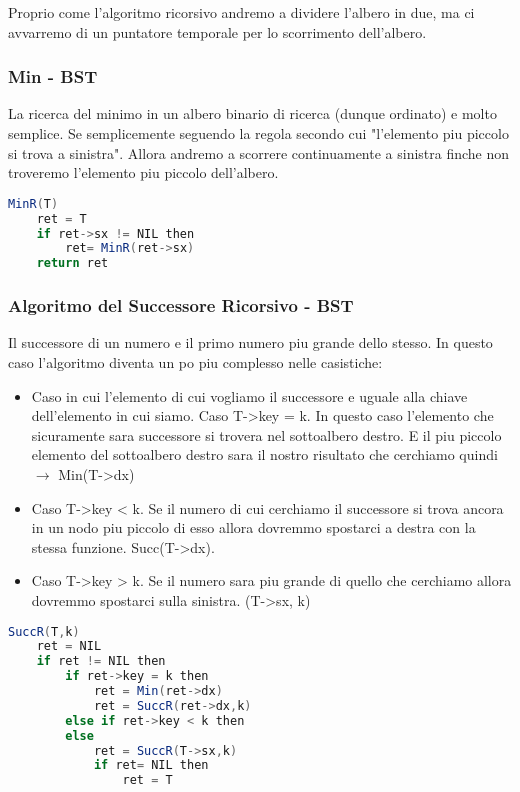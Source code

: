 Proprio come l'algoritmo ricorsivo andremo a dividere l'albero in due, ma ci avvarremo di un puntatore temporale per lo scorrimento dell'albero.

\subsubsection{Min - BST}
La ricerca del minimo in un albero binario di ricerca (dunque ordinato) e molto semplice. Se semplicemente seguendo la regola secondo cui "l'elemento piu piccolo si trova a sinistra". Allora andremo a scorrere continuamente a sinistra finche non troveremo l'elemento piu piccolo dell'albero.

\begin{lstlisting}[language=Java]
	MinR(T)
	ret = T
	if ret->sx != NIL then
		ret= MinR(ret->sx)
	return ret
\end{lstlisting}

\subsubsection{Algoritmo del Successore Ricorsivo - BST}
Il successore di un numero e il primo numero piu grande dello stesso. In questo caso l'algoritmo diventa un po piu complesso nelle casistiche:
\begin{itemize}
	\item  Caso in cui l'elemento di cui vogliamo il successore e uguale alla chiave dell'elemento in cui siamo. Caso T->key = k. In questo caso l'elemento che sicuramente sara successore si trovera nel sottoalbero destro. E il piu piccolo elemento del sottoalbero destro sara il nostro risultato che cerchiamo quindi $\rightarrow$ Min(T->dx)
	\item Caso T->key < k. Se il numero di cui cerchiamo il successore si trova ancora in un nodo piu piccolo di esso allora dovremmo spostarci a destra con la stessa funzione. Succ(T->dx).
	\item Caso T->key > k. Se il numero sara piu grande di quello che cerchiamo allora dovremmo spostarci sulla sinistra. (T->sx, k)
\end{itemize}

\begin{lstlisting}[language=Java]
	SuccR(T,k)
	ret = NIL
	if ret != NIL then
		if ret->key = k then
			ret = Min(ret->dx)
			ret = SuccR(ret->dx,k)
		else if ret->key < k then
		else 
			ret = SuccR(T->sx,k)
			if ret= NIL then
				ret = T
\end{lstlisting}

